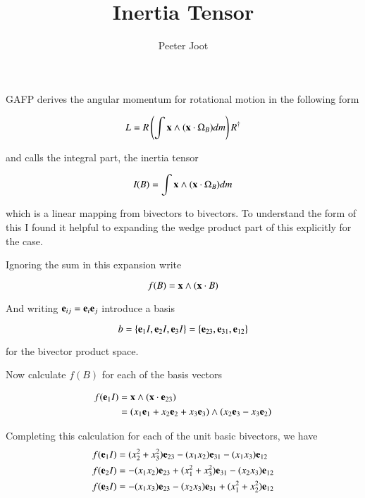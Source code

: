 \documentclass{article}      %
\title{Inertia Tensor} %
\author{Peeter Joot}         %
\begin{document}

\maketitle{}

\section{}

GAFP derives the angular momentum for rotational motion in the following form

\[
L = R \left( \int \mathbf{x} \wedge (\mathbf{x} \cdot \Omega_B) dm \right) R^\dagger
\]

and calls the integral part, the inertia tensor

\[
\emph{I}(B) = \int \mathbf{x} \wedge (\mathbf{x} \cdot \Omega_B) dm
\]

which is a linear mapping from bivectors to bivectors.  To understand the
form of this I found it helpful to expanding the wedge product
part of this explicitly for the  case.

Ignoring the sum in this expansion write

\[
f(B) = \mathbf{x} \wedge (\mathbf{x} \cdot B)
\]

And writing $\mathbf{e}_{ij} = \mathbf{e}_i \mathbf{e}_j$ introduce a basis

\[
b = \{ \mathbf{e}_1 I, \mathbf{e}_2 I, \mathbf{e}_3 I \} = \{ \mathbf{e}_{23}, \mathbf{e}_{31}, \mathbf{e}_{12} \}
\]

for the  bivector product space.

Now calculate $f(B)$ for each of the basis vectors

\begin{align*}
f(\mathbf{e}_1 I) 
&= \mathbf{x} \wedge (\mathbf{x} \cdot \mathbf{e}_{23}) \\
&= ( x_1 \mathbf{e}_1 + x_2 \mathbf{e}_2 + x_3 \mathbf{e}_3) \wedge (x_2 \mathbf{e}_3 - x_3 \mathbf{e}_2) \\
\end{align*}

Completing this calculation for each of the unit basic bivectors, we have
\begin{align*}
f(\mathbf{e}_1 I) &= (x_2^2 + x_3^2) \mathbf{e}_{23} - (x_1 x_2) \mathbf{e}_{31} - (x_1 x_3) \mathbf{e}_{12} \\
f(\mathbf{e}_2 I) &= -(x_1 x_2) \mathbf{e}_{23} + (x_1^2 + x_3^2) \mathbf{e}_{31} - (x_2 x_3) \mathbf{e}_{12} \\
f(\mathbf{e}_3 I) &= -(x_1 x_3) \mathbf{e}_{23} - (x_2 x_3) \mathbf{e}_{31} + (x_1^2 + x_2^2) \mathbf{e}_{12} \\
\end{align*}
\end{document}
